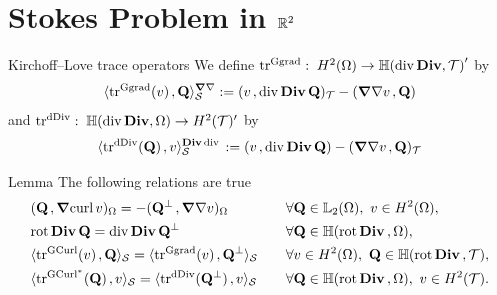 \documentclass[10pt]{beamer}
\begin{document}
\section{Stokes Problem in $\R^2$}
\begin{frame}{Kirchoff--Love trace operators}
We define $\traceGG{}:\;H^2(\Omega)\to\HdDiv{\cT}'$ by
\begin{align*} 
   \dualgg{\traceGG{}(v)}{\QQ}_\cS:=\vdual{v}{\div\Div\QQ}_\cT-\vdual{\Grad\grad v}{\QQ}
\end{align*}
and $\traceDD{}:\;\HdDiv{\Omega}\to H^2(\cT)'$ by 
\begin{align*}
   \dualdd{\traceDD{}(\QQ)}{v}_\cS:=\vdual{v}{\div\Div\QQ}-\vdual{\Grad\grad v}{\QQ}_\cT    
\end{align*}

\begin{block}{Lemma} The following relations are true  
\begin{alignat*}{2}
   &\vdual{\QQ}{\Grad\curl v}_\Omega = -\vdual{\QQ^\perp}{\Grad\grad v}_\Omega
   &&\quad\forall\QQ\in\LL_2(\Omega),\ v\in H^2(\Omega), \\
   &\rot\Div\QQ=\div\Div\QQ^\perp        &&\quad\forall \QQ\in\HrotDiv{\Omega}, \\
   &\dual{\tracegc{}(v)}{\QQ}_\cS = \dual{\traceGG{}(v)}{\QQ^\perp}_\cS
   &&\quad\forall v\in H^2(\Omega),\ \QQ\in\HrotDiv{\cT}, \\
   &\dual{\tra{}(\QQ)}{v}_\cS = \dual{\traceDD{}(\QQ^\perp)}{v}_\cS
   &&\quad\forall \QQ\in\HrotDiv{\Omega},\ v\in H^2(\cT).  
\end{alignat*}
\end{block}
\end{frame}
\end{document}

